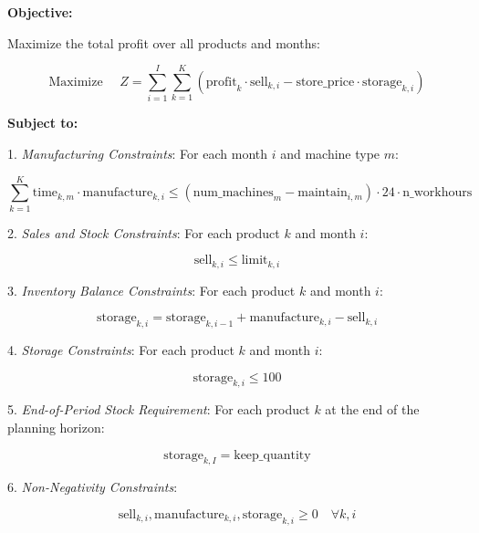 \documentclass{article}
\begin{document}
\textbf{Objective:}

Maximize the total profit over all products and months:

\[
\text{Maximize } \quad Z = \sum_{i=1}^{I} \sum_{k=1}^{K} \left( \text{profit}_k \cdot \text{sell}_{k,i} - \text{store\_price} \cdot \text{storage}_{k,i} \right)
\]

\textbf{Subject to:}

1. \textit{Manufacturing Constraints}: For each month \( i \) and machine type \( m \):

\[
\sum_{k=1}^{K} \text{time}_{k,m} \cdot \text{manufacture}_{k,i} \leq (\text{num\_machines}_m - \text{maintain}_{i,m}) \cdot 24 \cdot \text{n\_workhours} 
\]

2. \textit{Sales and Stock Constraints}: For each product \( k \) and month \( i \):

\[
\text{sell}_{k,i} \leq \text{limit}_{k,i}
\]

3. \textit{Inventory Balance Constraints}: For each product \( k \) and month \( i \):

\[
\text{storage}_{k,i} = \text{storage}_{k,i-1} + \text{manufacture}_{k,i} - \text{sell}_{k,i}
\]

4. \textit{Storage Constraints}: For each product \( k \) and month \( i \):

\[
\text{storage}_{k,i} \leq 100
\]

5. \textit{End-of-Period Stock Requirement}: For each product \( k \) at the end of the planning horizon:

\[
\text{storage}_{k,I} = \text{keep\_quantity}
\]

6. \textit{Non-Negativity Constraints}:

\[
\text{sell}_{k,i}, \text{manufacture}_{k,i}, \text{storage}_{k,i} \geq 0 \quad \forall k, i
\]
\end{document}
